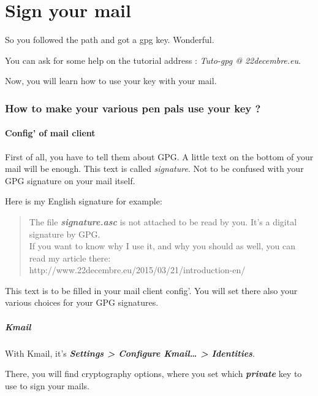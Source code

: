 \chapter{Sign your mail}

So you followed the path and got a gpg key. Wonderful.

You can ask for some help on the tutorial address : \emph{Tuto-gpg @
22decembre.eu}.

Now, you will learn how to use your key with your mail.

\subsection{How to make your various pen pals use your key
?}\label{how-to-make-your-various-pen-pals-use-your-key}

\subsubsection{Config' of mail client}\label{config-of-mail-client}

First of all, you have to tell them about GPG. A little text on the
bottom of your mail will be enough. This text is called
\emph{signature}. Not to be confused with your GPG signature on your
mail itself.

Here is my English signature for example:

\begin{quote}
The file \textbf{\emph{signature.asc}} is not attached to be read by
you. It's a digital signature by GPG.\\If you want to know why I use it,
and why you should as well, you can read my article
there:\\http://www.22decembre.eu/2015/03/21/introduction-en/
\end{quote}

This text is to be filled in your mail client config'. You will set
there also your various choices for your GPG signatures.

\paragraph{Kmail}\label{kmail}

With Kmail, it's \textbf{\emph{Settings \textgreater{} Configure
Kmail\ldots{} \textgreater{} Identities}}.

There, you will find cryptography options, where you set which
\textbf{\emph{private}} key to use to sign your mails.

